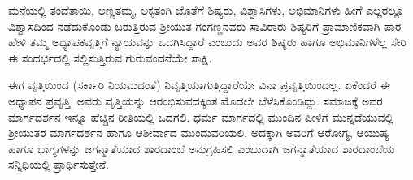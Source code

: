 {ಮನೆಯಲ್ಲಿ ತಂದೆ\enginline{-}ತಾಯಿ, ಅಣ್ಣ\enginline{-}ತಮ್ಮ, ಅಕ್ಕ\enginline{-}ತಂಗಿ ಜೊತೆಗೆ ಶಿಷ್ಯರು, ವಿಶ್ವಾಸಿಗಳು, ಅಭಿಮಾನಿಗಳು ಹೀಗೆ ಎಲ್ಲರಲ್ಲೂ ವಿಶ್ವಾಸದಿಂದ ನಡೆದುಕೊಂಡು ಬರುತ್ತಿರುವ ಶ್ರೀಯುತ ಗಂಗಣ್ಣನವರು ಸಾವಿರಾರು ಶಿಷ್ಯರಿಗೆ ಪ್ರಾಮಾಣಿಕವಾಗಿ ಪಾಠ ಹೇಳಿ ತಮ್ಮ ಅಧ್ಯಾಪಕವೃತ್ತಿಗೆ ನ್ಯಾಯವನ್ನು ಒದಗಿಸಿದ್ದಾರೆ ಎಂಬುದು ಅವರ ಶಿಷ್ಯರು ಹಾಗೂ ಅಭಿಮಾನಿಗಳೆಲ್ಲ ಸೇರಿ ಈ ಸಂದರ್ಭದಲ್ಲಿ ಸಲ್ಲಿಸುತ್ತಿರುವ ಗುರುವಂದನೆಯೇ ಸಾಕ್ಷಿ.

ಈಗ ವೃತ್ತಿಯಿಂದ (ಸರ್ಕಾರಿ ನಿಯಮದಂತೆ) ನಿವೃತ್ತಿಯಾಗುತ್ತಿದ್ದಾರೆಯೇ ವಿನಾ ಪ್ರವೃತ್ತಿಯಿಂದಲ್ಲ. ಏಕೆಂದರೆ ಈ ಅಧ್ಯಾಪನ ಪ್ರವೃತ್ತಿ, ಅವರು ವೃತ್ತಿಯನ್ನು ಆರಂಭಿ\-ಸುವ\-ದಕ್ಕಿಂತ ಮೊದಲೇ ಬೆಳೆಸಿಕೊಂಡಿದ್ದು. ಸಮಾಜಕ್ಕೆ ಅವರ ಮಾರ್ಗದರ್ಶನ ಇನ್ನೂ ಹೆಚ್ಚಿನ ರೀತಿಯಲ್ಲಿ ಒದಗಲಿ. ಧರ್ಮ ಮಾರ್ಗದಲ್ಲಿ ಮುಂದಿನ ಪೀಳಿಗೆ ಮುನ್ನಡೆಯುವಲ್ಲಿ ಶ್ರೀಯುತರ ಮಾರ್ಗದರ್ಶನ ಹಾಗೂ ಆಶೀರ್ವಾದ ಮುಂದುವರಿಯಲಿ. ಅದಕ್ಕಾಗಿ ಅವರಿಗೆ ಆರೋಗ್ಯ, ಆಯುಷ್ಯ ಹಾಗೂ ಭಾಗ್ಯಗಳನ್ನು ಜಗನ್ಮಾತೆಯಾದ ಶಾರದಾಂಬೆ ಅನುಗ್ರಹಿಸಲಿ ಎಂಬುದಾಗಿ ಜಗನ್ಮಾತೆಯಾದ ಶಾರದಾಂಬೆಯ ಸನ್ನಿಧಿಯಲ್ಲಿ ಪ್ರಾರ್ಥಿಸುತ್ತೇನೆ.

\articleend
}
